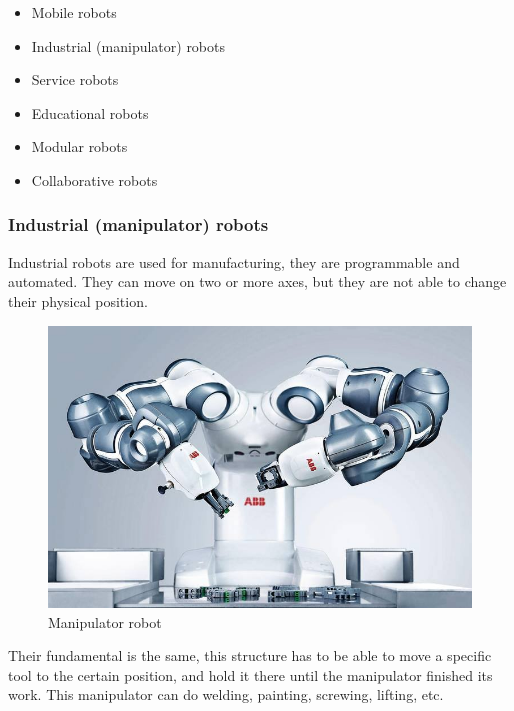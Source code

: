 			\begin{itemize}
				\item Mobile robots 
				\item Industrial (manipulator) robots 
				\item Service robots 
				\item Educational robots 
				\item Modular robots 
				\item Collaborative robots 
			\end{itemize}
			
			\subsubsection{Industrial (manipulator) robots}
			
				\hspace{15pt}Industrial robots are used for manufacturing, they are programmable and automated. They can move on two or more axes, but they are not able to change their physical position.
						
		\begin{figure}[H]
			\centering
			\includegraphics[width=\textwidth]{./images/manipulator}
			\caption{Manipulator robot}
		\end{figure}
				
				Their fundamental is the same, this structure has to be able to move a specific tool to the certain position, and hold it there until the manipulator finished its work. This manipulator can do welding, painting, screwing, lifting, etc. \cite{robotics2}


